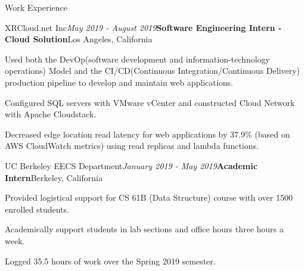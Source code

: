 \documentclass{resume}
\begin{document}
\begin{rSection}{Work Experience}

\begin{rSubsection}{XRCloud.net Inc}{\em May 2019 - August 2019}{\textbf{Software Engineering Intern - Cloud Solution}}{Los Angeles, California}{}
\item Used both the DevOp(software development and information-technology operations) Model and the CI/CD(Continuous Integration/Continuous Delivery) production pipeline to develop and maintain web applications.
\item Configured SQL servers with VMware vCenter and constructed Cloud Network with Apache Cloudstack.
\item Decreased edge location read latency for web applications by 37.9\% (based on AWS CloudWatch metrics) using read replicas and lambda functions.
\end{rSubsection}



\begin{rSubsection}{UC Berkeley EECS Department}{\em January 2019 - May 2019}{\textbf{Academic Intern}}{Berkeley, California}{}
\item Provided logistical support for CS 61B (Data Structure) course with over 1500 enrolled students.
\item Academically support students in lab sections and office hours three hours a week.
\item Logged 35.5 hours of work over the Spring 2019 semester. 
\end{rSubsection}

\end{rSection}
\end{document}
